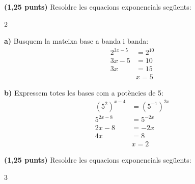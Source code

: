 \documentclass[12pt,a4paper]{exam}
\begin{document}
\begin{questions}
\question \textbf{(1,25 punts)} Resoldre les equacions exponencials següents:
\begin{multicols}{2}
\end{multicols}
\begin{solution}
    \textbf{a)} Busquem la mateixa base a banda i banda:
    \begin{align*}
        2^{3x-5} &= 2^{10} \\
        3x - 5 &= 10 \\
        3x &= 15 \\
        &\boxed{x = 5}
    \end{align*}
    
    \textbf{b)} Expressem totes les bases com a potències de 5:
    \begin{align*}
        (5^2)^{x-4} &= (5^{-1})^{2x} \\
        5^{2x-8} &= 5^{-2x} \\
        2x - 8 &= -2x \\
        4x &= 8 \\
        &\boxed{x = 2}
    \end{align*}
\end{solution}

\question \textbf{(1,25 punts)} Resoldre les equacions exponencials següents:
\begin{multicols}{3}
\end{multicols}
\end{questions}
\end{document}
